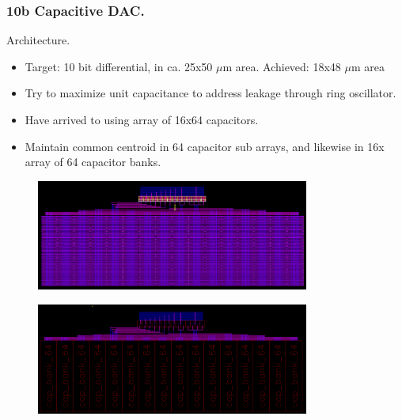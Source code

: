 \documentclass[t, screen, aspectratio=43]{beamer}
\begin{document}
\begin{frame}
	\frametitle{10b Capacitive DAC.}
	\begin{block}{Architecture.}
		\begin{minipage}{4cm}
			\vspace{1em}
			\tiny
			\begin{itemize}[itemsep=4pt,label=\protect---]
			        \item Target: 10 bit differential, in ca. 25x50 $\mu$m area. Achieved: 18x48 $\mu$m area
			        \item Try to maximize unit capacitance to address leakage through ring oscillator.
			        \item Have arrived to using array of 16x64 capacitors.
			        \item Maintain common centroid in 64 capacitor sub arrays, and likewise in 16x array of 64 capacitor banks.
			\end{itemize}
		\end{minipage}%
		\begin{minipage}{8cm}
			\begin{figure}[htb!]
			        \centering
			        \includegraphics[width=0.8\textwidth, angle=0]{10b_cdac}
			\end{figure}
			\begin{figure}[htb!]
			        \centering
			        \includegraphics[width=0.8\textwidth, angle=0]{10b_cdac_2}
			\end{figure}
		\end{minipage}%

	\end{block}	
\end{frame}
\end{document}
